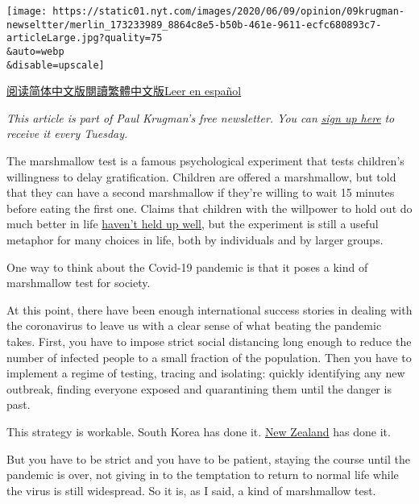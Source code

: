 \texttt{[image: https://static01.nyt.com/images/2020/06/09/opinion/09krugman-newseltter/merlin\_173233989\_8864c8e5-b50b-461e-9611-ecfc680893c7-articleLarge.jpg?quality=75\\\&auto=webp\\\&disable=upscale]}

\href{https://cn.nytimes.com/opinion/20200610/coronavirus-reopening-marshmallow-test/}{阅读简体中文版}\href{https://cn.nytimes.com/opinion/20200610/coronavirus-reopening-marshmallow-test/zh-hant/}{閱讀繁體中文版}\href{https://www.nytimes.com/es/2020/06/11/espanol/opinion/coronavirus-economia-krugman.html}{Leer
en español}

\emph{This article is part of Paul Krugman's free newsletter. You can}
\href{https://www.nytimes.com/newsletters/paul-krugman}{\emph{sign up
here}} \emph{to receive it every Tuesday.}

The marshmallow test is a famous psychological experiment that tests
children's willingness to delay gratification. Children are offered a
marshmallow, but told that they can have a second marshmallow if they're
willing to wait 15 minutes before eating the first one. Claims that
children with the willpower to hold out do much better in life
\href{https://www.theatlantic.com/family/archive/2018/06/marshmallow-test/561779/}{haven't
held up well}, but the experiment is still a useful metaphor for many
choices in life, both by individuals and by larger groups.

One way to think about the Covid-19 pandemic is that it poses a kind of
marshmallow test for society.

At this point, there have been enough international success stories in
dealing with the coronavirus to leave us with a clear sense of what
beating the pandemic takes. First, you have to impose strict social
distancing long enough to reduce the number of infected people to a
small fraction of the population. Then you have to implement a regime of
testing, tracing and isolating: quickly identifying any new outbreak,
finding everyone exposed and quarantining them until the danger is past.

This strategy is workable. South Korea has done it.
\href{https://www.nytimes.com/2020/06/08/world/australia/new-zealand-coronavirus-ardern.html}{New
Zealand} has done it.

But you have to be strict and you have to be patient, staying the course
until the pandemic is over, not giving in to the temptation to return to
normal life while the virus is still widespread. So it is, as I said, a
kind of marshmallow test.

